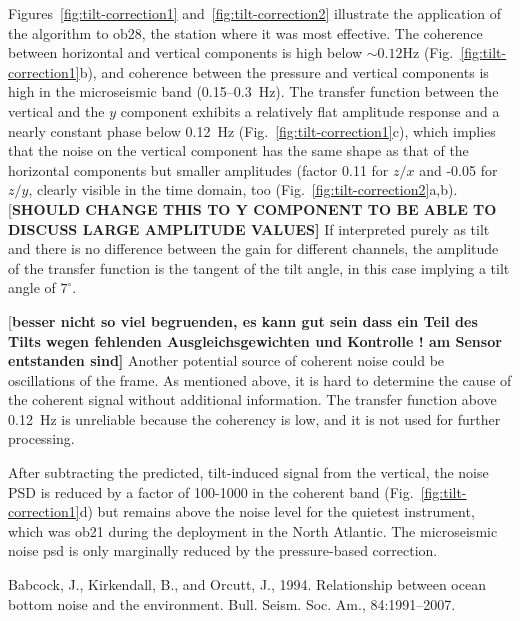 \documentclass{article}
\providecommand{\remark}[1]{{[\bf #1]}}
\begin{document}
{Figures~\ref{fig:tilt-correction1}
and~\ref{fig:tilt-correction2} illustrate the application of the
algorithm to ob28, the station where it was most effective. The
coherence between horizontal  and vertical components is high
below $\sim 0.12$Hz (Fig.~\ref{fig:tilt-correction1}b), and coherence
between the pressure and vertical components is high in the
microseismic band (0.15--0.3~Hz). The transfer function between the
vertical and the $y$ component exhibits a relatively flat amplitude
response and a nearly constant phase below 0.12~Hz (Fig.~\ref{fig:tilt-correction1}c), which implies that
the noise on the vertical component has the same shape as that of the
horizontal  components but smaller amplitudes (factor 0.11 for $z/x$
and -0.05 for $z/y$, clearly visible in
the time domain, too (Fig.~\ref{fig:tilt-correction2}a,b).
\remark{SHOULD CHANGE THIS TO Y COMPONENT TO BE ABLE TO DISCUSS LARGE
  AMPLITUDE VALUES} 
If interpreted purely as tilt and there is no
difference between the gain for different channels, the amplitude of
the transfer function is the tangent of the tilt angle, in this case
implying a tilt angle of $7^{\circ}$.

\remark{besser nicht so viel begruenden, es kann gut sein dass 
ein Teil des Tilts wegen fehlenden Ausgleichsgewichten 
und Kontrolle ! am Sensor entstanden sind}
Another potential source of coherent noise
could be oscillations of the frame.  As mentioned above, it is hard to
determine the cause of the coherent signal without additional
information.  The transfer function above
0.12~Hz is unreliable because the coherency is low, and it is not used
for further processing.

After subtracting the predicted, tilt-induced signal from 
the vertical, 
the noise PSD is reduced by a factor of 100-1000
in the coherent band 
(Fig.~\ref{fig:tilt-correction1}d) 
but remains above the noise level for the
quietest instrument, 
 which was ob21 during the deployment in the 
North Atlantic.  
The microseismic noise psd is only
marginally reduced by the pressure-based correction.

 
%
%
\begin{thebibliography}{}

Babcock, J., Kirkendall, B., and Orcutt, J., 1994.
\newblock Relationship between ocean bottom noise and the environment.
\newblock Bull. Seism. Soc. Am., 84:1991--2007.


\end{thebibliography}}
\end{document}

